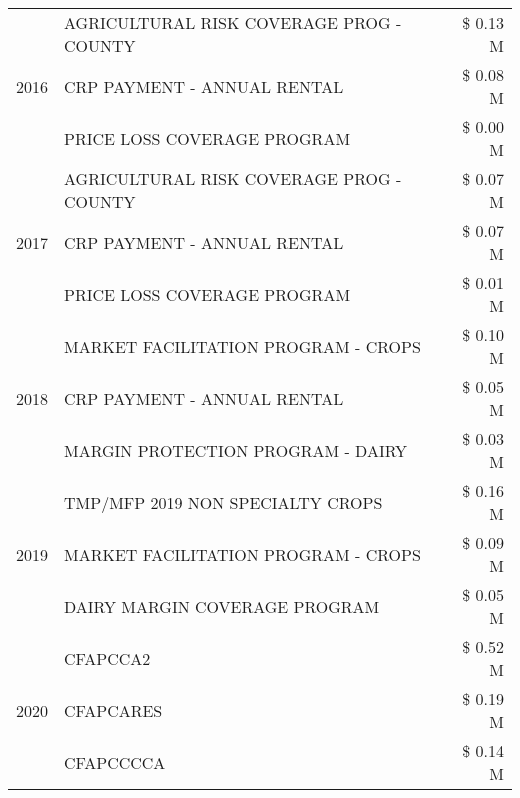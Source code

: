 \begin{tabular}{llr}
\cline{1-3}
\multirow[t]{3}{*}{2016} & AGRICULTURAL RISK COVERAGE PROG - COUNTY & \$ 0.13 M \\
 & CRP PAYMENT - ANNUAL RENTAL & \$ 0.08 M \\
 & PRICE LOSS COVERAGE PROGRAM & \$ 0.00 M \\
\cline{1-3}
\multirow[t]{3}{*}{2017} & AGRICULTURAL RISK COVERAGE PROG - COUNTY & \$ 0.07 M \\
 & CRP PAYMENT - ANNUAL RENTAL & \$ 0.07 M \\
 & PRICE LOSS COVERAGE PROGRAM & \$ 0.01 M \\
\cline{1-3}
\multirow[t]{3}{*}{2018} & MARKET FACILITATION PROGRAM - CROPS & \$ 0.10 M \\
 & CRP PAYMENT - ANNUAL RENTAL & \$ 0.05 M \\
 & MARGIN PROTECTION PROGRAM - DAIRY & \$ 0.03 M \\
\cline{1-3}
\multirow[t]{3}{*}{2019} & TMP/MFP 2019 NON SPECIALTY CROPS & \$ 0.16 M \\
 & MARKET FACILITATION PROGRAM - CROPS & \$ 0.09 M \\
 & DAIRY MARGIN COVERAGE PROGRAM & \$ 0.05 M \\
\cline{1-3}
\multirow[t]{3}{*}{2020} & CFAPCCA2 & \$ 0.52 M \\
 & CFAPCARES & \$ 0.19 M \\
 & CFAPCCCCA & \$ 0.14 M \\
\cline{1-3}
\bottomrule
\end{tabular}
